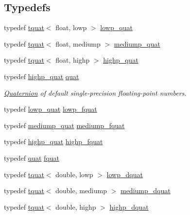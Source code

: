 \subsection*{Typedefs}
\begin{DoxyCompactItemize}
\item 
typedef \hyperlink{structglm_1_1tquat}{tquat}$<$ float, lowp $>$ \hyperlink{namespaceglm_a8437cbf48dab98eb12880f5aa7c1e038}{lowp\+\_\+quat}
\item 
typedef \hyperlink{structglm_1_1tquat}{tquat}$<$ float, mediump $>$ \hyperlink{namespaceglm_af74a4aa722b85bc0903d5e443be7030f}{mediump\+\_\+quat}
\item 
typedef \hyperlink{structglm_1_1tquat}{tquat}$<$ float, highp $>$ \hyperlink{namespaceglm_afc8001868f5332316cf2c9f68988d902}{highp\+\_\+quat}
\item 
typedef \hyperlink{namespaceglm_afc8001868f5332316cf2c9f68988d902}{highp\+\_\+quat} \hyperlink{namespaceglm_ac1f6a5957091b849730ea6f05a6b7ad6}{quat}
\begin{DoxyCompactList}\small\item\em \hyperlink{class_quaternion}{Quaternion} of default single-\/precision floating-\/point numbers. \end{DoxyCompactList}\item 
typedef \hyperlink{namespaceglm_a8437cbf48dab98eb12880f5aa7c1e038}{lowp\+\_\+quat} \hyperlink{namespaceglm_aad1f5b3c348c223fb36e28f646552cff}{lowp\+\_\+fquat}
\item 
typedef \hyperlink{namespaceglm_af74a4aa722b85bc0903d5e443be7030f}{mediump\+\_\+quat} \hyperlink{namespaceglm_a154ae157e20a677e5663d97b923b1053}{mediump\+\_\+fquat}
\item 
typedef \hyperlink{namespaceglm_afc8001868f5332316cf2c9f68988d902}{highp\+\_\+quat} \hyperlink{namespaceglm_ad1acf6af4ae4af94dfec8814b058d5eb}{highp\+\_\+fquat}
\item 
typedef \hyperlink{namespaceglm_ac1f6a5957091b849730ea6f05a6b7ad6}{quat} \hyperlink{namespaceglm_aa95d73f08018f3864c6ae08dbf1c59f2}{fquat}
\item 
typedef \hyperlink{structglm_1_1tquat}{tquat}$<$ double, lowp $>$ \hyperlink{namespaceglm_afd356c86886c573cdd2952e54a59ca94}{lowp\+\_\+dquat}
\item 
typedef \hyperlink{structglm_1_1tquat}{tquat}$<$ double, mediump $>$ \hyperlink{namespaceglm_ae5feb45196f5e0d2b4e61873a08771f5}{mediump\+\_\+dquat}
\item 
typedef \hyperlink{structglm_1_1tquat}{tquat}$<$ double, highp $>$ \hyperlink{namespaceglm_a8bcc5a1042194d46762e0d00fd627670}{highp\+\_\+dquat}

\end{DoxyCompactItemize}
